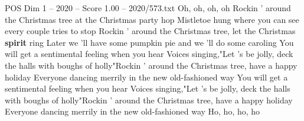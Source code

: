 \begin{textsample}{POS Dim 1 – 2020 – Score 1.00 – 2020/573.txt}  \label{ex:f1_pos_005}
Oh, oh, oh, oh Rockin ' around the Christmas tree at the Christmas party hop Mistletoe hung where you can see every couple tries to stop Rockin ' around the Christmas tree, let the Christmas \textbf{spirit} ring Later we 'll have some pumpkin pie and we 'll do some caroling You will get a sentimental feeling when you hear Voices singing,"Let 's be jolly, deck the halls with boughs of holly"Rockin ' around the Christmas tree, have a happy holiday Everyone dancing merrily in the new old-fashioned way You will get a sentimental feeling when you hear Voices singing,"Let 's be jolly, deck the halls with boughs of holly"Rockin ' around the Christmas tree, have a happy holiday Everyone dancing merrily in the new old-fashioned way Ho, ho, ho, ho

\end{textsample}
